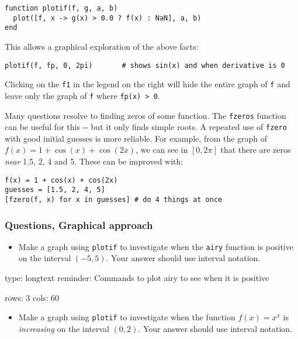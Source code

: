\documentclass[12pt]{article}
\begin{document}
\begin{verbatim}
function plotif(f, g, a, b)
  plot([f, x -> g(x) > 0.0 ? f(x) : NaN], a, b)
end
\end{verbatim}
This allows a graphical exploration of the above facts:



\begin{verbatim}
plotif(f, fp, 0, 2pi)       # shows sin(x) and when derivative is 0
\end{verbatim}
Clicking on the \texttt{f1} in the legend on the right will hide the
entire graph of \texttt{f} and leave only the graph of \texttt{f} where
\texttt{fp(x) \textgreater{} 0}.



Many questions resolve to finding zeros of some function. The
\texttt{fzeros} function can be useful for this -{}- but it only finds
simple roots. A repeated use of \texttt{fzero} with good initial guesses
is more reliable. For example, from the graph of
$f(x) = 1 + \cos(x) + \cos(2x)$, we can see in $[0,2\pi]$ that there are
zeros \emph{near} 1.5, 2, 4 and 5. These can be improved with:



\begin{verbatim}
f(x) = 1 + cos(x) + cos(2x)
guesses = [1.5, 2, 4, 5]
[fzero(f, x) for x in guesses] # do 4 things at once
\end{verbatim}
\subsubsection{Questions, Graphical approach}

\begin{itemize}
\itemsep1pt\parskip0pt
\item
  Make a graph using \texttt{plotif} to investigate when the
  \texttt{airy} function is positive on the interval $(-5,5)$. Your
  answer should use interval notation.
\end{itemize}

\begin{answer}
type: longtext
reminder: Commands to plot airy to see when it is positive

rows: 3
cols: 60
\end{answer}

\begin{itemize}
\itemsep1pt\parskip0pt
\item
  Make a graph using \texttt{plotif} to investigate when the function
  $f(x) =   x^x$ is \emph{increasing} on the interval $(0,2)$. Your
  answer should use interval notation.
\end{itemize}
\end{document}
